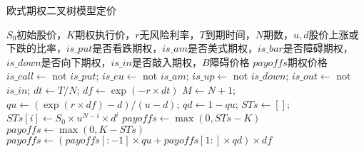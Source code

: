 \documentclass[11pt]{ctexart}
\begin{document}
    \begin{algorithm}
        \caption{欧式期权二叉树模型定价}
        \begin{algorithmic}[1] %
            \Require $S_0$初始股价，$K$期权执行价，$r$无风险利率，$T$到期时间，$N$期数，$u,d$股价上涨或下跌的比率，$is\_put$是否看跌期权，$is\_am$是否美式期权，$is\_bar$是否障碍期权，$is\_down$是否向下期权，$is\_in$是否敲入期权，$B$障碍价格
            \Ensure $payoffs$期权价格
                \State $is\_call \gets$ not $is\_put$; $is\_eu \gets$ not $is\_am$;
                \State $is\_up \gets$ not $is\_down$; $is\_out \gets$ not $is\_in$;
                \State $dt \gets T/N$; $df \gets \exp(-r \times dt)$
            \EndFunction
            \State
                \State $M \gets N+1$; $qu \gets (\exp(r \times df) - d) / (u-d)$;
                \State $qd \gets 1-qu$; $STs \gets []$;
                    \State $STs[i] \gets S_0 \times u^{N-i} \times d^{i}$
                \EndFor
                    \State $payoffs \gets \max(0, STs - K)$
                \Else
                    \State $payoffs \gets \max(0, K - STs)$
                \EndIf
                    \State $payoffs \gets (payoffs[:-1]\times qu + payoffs[1:]\times qd) \times df$
                \EndFor\\
            \EndFunction
        \end{algorithmic}
    \end{algorithm}
\end{document}

